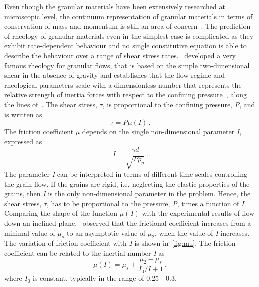 Even though the granular materials have been extensively researched at 
microscopic level, the continuum representation of granular materials in terms 
of conservation of mass and momentum is still an area of 
concern~\citep{Midi2004,Daniel2007}. The prediction of rheology of granular 
materials even in the simplest case is complicated as they exhibit 
rate-dependent behaviour and no single constitutive equation is able to 
describe the behaviour over a range of shear stress rates.~\citet{DaCruz2005} 
developed a very famous rheology for granular flows, that is based on the 
simple two-dimensional shear in the absence of gravity and establishes that the 
flow regime and rheological parameters scale with a dimensionless number that 
represents the relative strength of inertia forces with respect to the 
confining pressure~\citep{Daniel2007}, along the lines of~\citet{Savage1991}. 
The shear stress, $\tau$, is proportional to the confining pressure, 
\textit{P}, and is written as
%
\begin{equation}
\tau = \textit{P} \mu (\textit{I}) \,.
\end{equation}
%
The friction coefficient $\mu$ depends on the single non-dimensional parameter 
\textit{I}, expressed as
\begin{equation}
\textit{I} = \frac{\dot{\gamma}d}{\sqrt{\textit{P}\rho_{\textit{p}}}} \,.
\end{equation}
%
The parameter \textit{I} can be interpreted in terms of different time scales 
controlling the grain flow. If the grains are rigid, i.e. neglecting the 
elastic properties of the grains, then \textit{I} is the only 
non-dimensional parameter in the problem. Hence, the shear stress, $\tau$, has 
to be proportional to the pressure, \textit{P}, times a function of \textit{I}. 
Comparing the shape of the function $\mu(\textit{I})$ with the experimental 
results of flow down an inclined plane,~\citet{Jop2006} observed that the 
frictional coefficient increases from a minimal value of $\mu_{\textit{s}}$ to 
an asymptotic value of $\mu_{2}$, when the value of \textit{I} increases. The 
variation of friction coefficient with \textit{I} is shown in~\cref{fig:mu}. 
The friction coefficient can be related to the inertial number \textit{I} as
%
\begin{equation}
\mu(I) = \mu_s + \frac{\mu_2 - \mu_s}{I_0/I+1} \,,
\end{equation}
%
where $I_0$ is constant, typically in the range of 0.25 - 0.3. 

